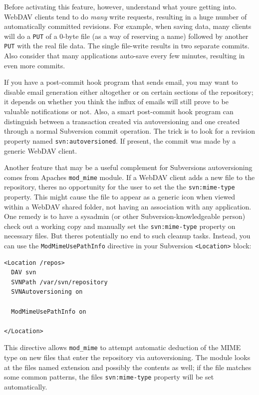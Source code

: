 Before activating this feature, however, understand what
you\textquotesingle re getting into. WebDAV clients tend to do
\emph{many} write requests, resulting in a huge number of automatically
committed revisions. For example, when saving data, many clients will do
a \texttt{PUT} of a 0-byte file (as a way of reserving a name) followed
by another \texttt{PUT} with the real file data. The single file-write
results in two separate commits. Also consider that many applications
auto-save every few minutes, resulting in even more commits.

If you have a post-commit hook program that sends email, you may want to
disable email generation either altogether or on certain sections of the
repository; it depends on whether you think the influx of emails will
still prove to be valuable notifications or not. Also, a smart
post-commit hook program can distinguish between a transaction created
via autoversioning and one created through a normal Subversion commit
operation. The trick is to look for a revision property named
\texttt{svn:autoversioned}. If present, the commit was made by a generic
WebDAV client.

Another feature that may be a useful complement for
Subversion\textquotesingle s autoversioning comes from
Apache\textquotesingle s \texttt{mod\_mime} module. If a WebDAV client
adds a new file to the repository, there\textquotesingle s no
opportunity for the user to set the the \texttt{svn:mime-type} property.
This might cause the file to appear as a generic icon when viewed within
a WebDAV shared folder, not having an association with any application.
One remedy is to have a sysadmin (or other Subversion-knowledgeable
person) check out a working copy and manually set the
\texttt{svn:mime-type} property on necessary files. But
there\textquotesingle s potentially no end to such cleanup tasks.
Instead, you can use the \texttt{ModMimeUsePathInfo} directive in your
Subversion \texttt{\textless{}Location\textgreater{}} block:

\begin{verbatim}
<Location /repos>
  DAV svn
  SVNPath /var/svn/repository
  SVNAutoversioning on

  ModMimeUsePathInfo on

</Location>
\end{verbatim}

This directive allows \texttt{mod\_mime} to attempt automatic deduction
of the MIME type on new files that enter the repository via
autoversioning. The module looks at the file\textquotesingle s named
extension and possibly the contents as well; if the file matches some
common patterns, the file\textquotesingle s \texttt{svn:mime-type}
property will be set automatically.


